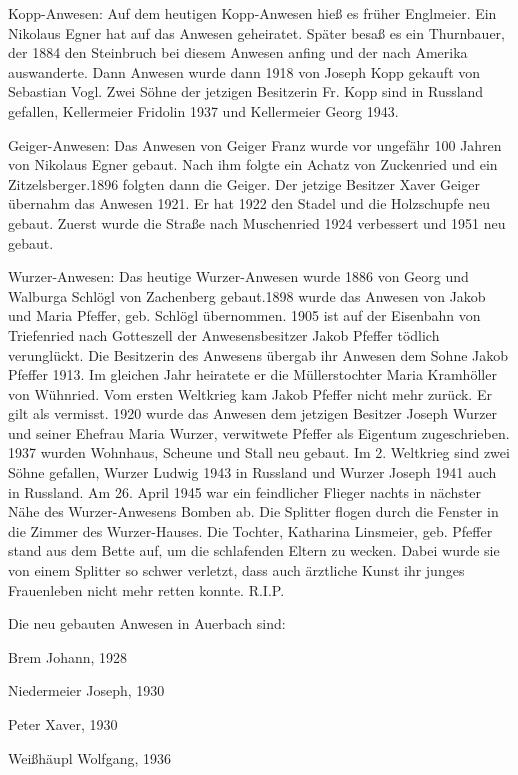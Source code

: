 Kopp-Anwesen: Auf dem heutigen Kopp-Anwesen hieß es früher Englmeier. Ein
Nikolaus Egner hat auf das Anwesen geheiratet. Später besaß es ein Thurnbauer,
der 1884 den Steinbruch bei diesem Anwesen anfing und der nach Amerika
auswanderte. Dann Anwesen wurde dann 1918 von Joseph Kopp gekauft von Sebastian
Vogl. Zwei Söhne der jetzigen Besitzerin Fr. Kopp sind in Russland gefallen,
Kellermeier Fridolin 1937 und Kellermeier Georg 1943.

Geiger-Anwesen: Das Anwesen von Geiger Franz wurde vor ungefähr 100 Jahren von
Nikolaus Egner gebaut. Nach ihm folgte ein Achatz von Zuckenried und ein
Zitzelsberger.1896 folgten dann die Geiger. Der jetzige Besitzer Xaver Geiger
übernahm das Anwesen 1921. Er hat 1922 den Stadel und die Holzschupfe neu
gebaut. Zuerst wurde die Straße nach Muschenried 1924 verbessert und 1951 neu
gebaut.

Wurzer-Anwesen: Das heutige Wurzer-Anwesen wurde 1886 von Georg und Walburga
Schlögl von Zachenberg gebaut.1898 wurde das Anwesen von Jakob und Maria
Pfeffer, geb. Schlögl übernommen. 1905 ist auf der Eisenbahn von Triefenried
nach Gotteszell der Anwesensbesitzer Jakob Pfeffer tödlich verunglückt. Die
Besitzerin des Anwesens übergab ihr Anwesen dem Sohne Jakob Pfeffer 1913. Im
gleichen Jahr heiratete er die Müllerstochter Maria Kramhöller von Wühnried. Vom
ersten Weltkrieg kam Jakob Pfeffer nicht mehr zurück. Er gilt als vermisst. 1920
wurde das Anwesen dem jetzigen Besitzer Joseph Wurzer und seiner Ehefrau Maria
Wurzer, verwitwete Pfeffer als Eigentum zugeschrieben. 1937 wurden Wohnhaus,
Scheune und Stall neu gebaut. Im 2. Weltkrieg sind zwei Söhne gefallen, Wurzer
Ludwig 1943 in Russland und Wurzer Joseph 1941 auch in Russland. Am 26. April
1945 war ein feindlicher Flieger nachts in nächster Nähe des Wurzer-Anwesens
Bomben ab. Die Splitter flogen durch die Fenster in die Zimmer des
Wurzer-Hauses. Die Tochter, Katharina Linsmeier, geb. Pfeffer stand aus dem
Bette auf‚ um die schlafenden Eltern zu wecken. Dabei wurde sie von einem
Splitter so schwer verletzt, dass auch ärztliche Kunst ihr junges Frauenleben
nicht mehr retten konnte. R.I.P.



Die neu gebauten Anwesen in Auerbach sind:



Brem Johann, 1928

Niedermeier Joseph, 1930

Peter Xaver, 1930

Weißhäupl Wolfgang, 1936

